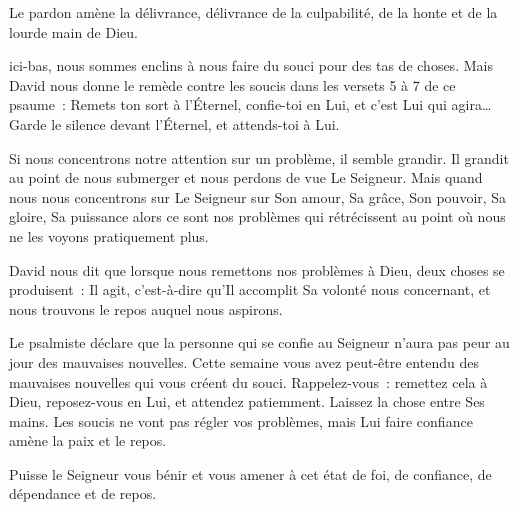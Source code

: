 Le pardon amène la délivrance, délivrance de la culpabilité,
 de la honte et de la lourde main de Dieu. 

\dvrule






 ici-bas, nous sommes enclins
 à nous faire du souci pour des tas de choses.
 Mais David nous donne le remède contre les soucis dans
 les versets 5 à 7 de ce psaume~:
 \og Remets ton sort à l'Éternel, confie-toi en Lui,
 et c'est Lui qui agira\dots{}
 Garde le silence devant l'Éternel, et attends-toi à Lui. \fg{}

Si nous concentrons notre attention sur un problème, il semble grandir.
 Il grandit au point de nous submerger et nous perdons de vue Le Seigneur.
 Mais quand nous nous concentrons sur Le Seigneur
 \ocadr sur Son amour, Sa grâce, Son pouvoir, Sa gloire, Sa puissance \fcadr{}
 alors ce sont nos problèmes qui rétrécissent au point
 où nous ne les voyons pratiquement plus. 


David nous dit que lorsque nous remettons nos problèmes à Dieu,
 deux choses se produisent~: Il agit, c'est-à-dire qu'Il accomplit
 Sa volonté nous concernant, et nous trouvons le repos auquel nous aspirons.

Le psalmiste déclare que la personne qui se confie au Seigneur
 n'aura pas peur au jour des mauvaises nouvelles.
 Cette semaine vous avez peut-être entendu des mauvaises nouvelles
 qui vous créent du souci. Rappelez-vous~: remettez cela à Dieu,
 reposez-vous en Lui, et attendez patiemment.
 Laissez la chose entre Ses mains.
 Les soucis ne vont pas régler vos problèmes,
 mais Lui faire confiance amène la paix et le repos. 

Puisse le Seigneur vous bénir et vous amener à cet état de foi,
 de confiance, de dépendance et de repos. 

\dvrule



